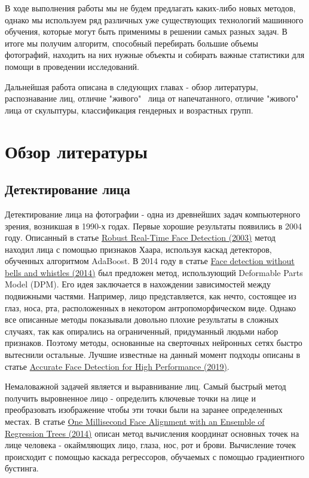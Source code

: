 \documentclass[a4paper,14pt]{extarticle}
\newcommand{\bibref}[3]{\hyperlink{#1}{#2 (#3)}} %
\begin{document}
    \par В ходе выполнения работы мы не будем предлагать каких-либо новых методов, однако мы используем ряд различных уже существующих технологий машинного обучения, которые могут быть применимы в решении самых разных задач. В итоге мы получим алгоритм, способный перебирать большие объемы фотографий, находить на них нужные объекты и собирать важные статистики для помощи в проведении исследований.
    \par Дальнейшая работа описана в следующих главах - обзор литературы, распознавание лиц, отличие "живого" \, лица от напечатанного, отличие "живого" \, лица от скульптуры, классификация гендерных и возрастных групп.
    \newpage

    \section{Обзор литературы}
    \subsection{Детектирование лица}
    Детектирование лица на фотографии - одна из древнейших задач компьютерного зрения, возникшая в 1990-х годах. Первые хорошие результаты появились в 2004 году. Описанный в статье \bibref{face_detection}{Robust Real-Time Face Detection}{2003} метод находил лица с помощью признаков Хаара, используя каскад детекторов, обученных алгоритмом AdaBoost. В 2014 году в статье \bibref{face_detection2}{Face detection without bells and whistles}{2014} был предложен метод, использующий Deformable Parts Model (DPM). Его идея заключается в нахождении зависимостей между подвижными частями. Например, лицо представляется, как нечто, состоящее из глаз, носа, рта, расположенных в некотором антропоморфическом виде. Однако все описанные методы показывали довольно плохие результаты в сложных случаях, так как опирались на ограниченный, придуманный людьми набор признаков. Поэтому методы, основанные на сверточных нейронных сетях быстро вытеснили остальные. Лучшие известные на данный момент подходы описаны в статье \bibref{face_detection3}{Accurate Face Detection for High Performance}{2019}.
    \par Немаловажной задачей является и выравнивание лиц. Самый быстрый метод получить выровненное лицо - определить ключевые точки на лице и преобразовать изображение чтобы эти точки были на заранее определенных местах. В статье \bibref{align}{One Millisecond Face Alignment with an Ensemble of Regression Trees}{2014} описан метод вычисления координат основных точек на лице человека - окаймляющих лицо, глаза, нос, рот и брови. Вычисление точек происходит с помощью каскада регрессоров, обучаемых с помощью градиентного бустинга.
\end{document}
